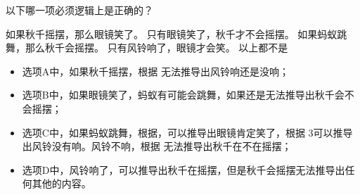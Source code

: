 \documentclass[answers]{exam}
\begin{document}
\begin{questions}
	以下哪一项必须逻辑上是正确的？

	\begin{oneparchoices}
		\choice 如果秋千摇摆，那么眼镜笑了。
		\choice 只有眼镜笑了，秋千才不会摇摆。
		\choice 如果蚂蚁跳舞，那么秋千会摇摆。
		\choice 只有风铃响了，眼镜才会笑。
		\choice 以上都不是
	\end{oneparchoices}

	\begin{solution}
	\begin{itemize}
		\item 选项A中，如果秋千摇摆，根据  无法推导出风铃响还是没响；
		\item 选项B中，如果眼镜笑了，蚂蚁有可能会跳舞，如果还是无法推导出秋千会不会摇摆；
		\item 选项C中，如果蚂蚁跳舞，根据，可以推导出眼镜肯定笑了，根据\romannumeral
			3可以推导出风铃没有响。风铃不响，根据 无法推导出秋千在不在摇摆；
		\item 选项D中，风铃响了，可以推导出秋千在摇摆，但是秋千会摇摆无法推导出任何其他的内容。
	\end{itemize}
	\end{solution}

\end{questions}
\end{document}
